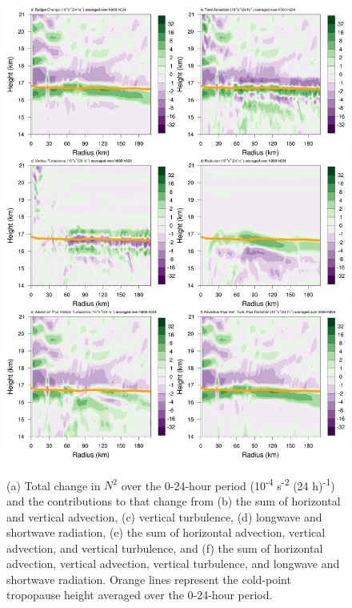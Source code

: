 \documentclass{ametsoc}
\begin{document}
\begin{figure}[ht]
\centerline{\includegraphics[width=39pc]{figures/h000-h024-budgetterms.png}}
\end{figure}
\begin{figure}
\caption{(a) Total change in $N^2$ over the 0-24-hour period (10\textsuperscript{-4} s\textsuperscript{-2} (24 h)\textsuperscript{-1}) and the contributions to that change from (b) the sum of horizontal and vertical advection, (c) vertical turbulence, (d) longwave and shortwave radiation, (e) the sum of horizontal advection, vertical advection, and vertical turbulence, and (f) the sum of horizontal advection, vertical advection, vertical turbulence, and longwave and shortwave radiation.
Orange lines represent the cold-point tropopause height averaged over the 0-24-hour period.}
\label{fig:stab-00-24}
\end{figure}
\end{document}
